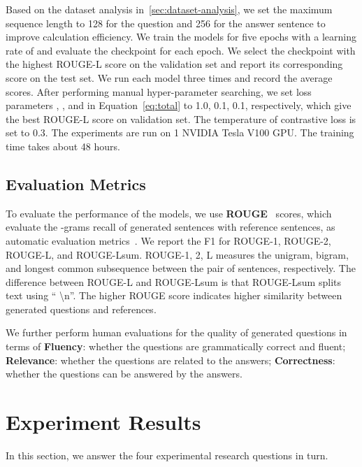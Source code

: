 \documentclass[11pt]{article}
\begin{document}
Based on the dataset analysis in~\ref{sec:dataset-analysis}, we set the maximum sequence length to 128 for the question and 256 for the answer sentence to improve calculation efficiency.
We train the models for five epochs with a learning rate of  and evaluate the checkpoint for each epoch. 
We select the checkpoint with the highest ROUGE-L score on the validation set and report its corresponding score on the test set.
We run each model three times and record the average scores. 
After performing manual hyper-parameter searching, we set loss parameters , , and  in Equation~\ref{eq:total} to 1.0, 0.1, 0.1, respectively, which give the best ROUGE-L score on validation set. The temperature of contrastive loss  is set to 0.3. The experiments are run on 1 NVIDIA Tesla V100 GPU. The training time takes about 48 hours.

\subsection{Evaluation Metrics}
To evaluate the performance of the models, we use \textbf{ROUGE}~\cite{lin-2004-rouge} scores, which evaluate the -grams recall of generated sentences with reference sentences, as automatic evaluation metrics~\cite{fan-etal-2019-eli5,khashabi-etal-2021-gooaq-open}. We report the F1 for ROUGE-1, ROUGE-2, ROUGE-L, and ROUGE-Lsum. ROUGE-1, 2, L measures the unigram, bigram, and longest common subsequence between the pair of sentences, respectively. The difference between ROUGE-L and ROUGE-Lsum is that ROUGE-Lsum splits text using `` \textbackslash n''. The higher ROUGE score indicates higher similarity between generated questions and references. 

We further perform human evaluations for the quality of generated questions in terms of \textbf{Fluency}: whether the questions are grammatically correct and fluent; \textbf{Relevance}: whether the questions are related to the answers; \textbf{Correctness}: whether the questions can be answered by the answers.

\section{Experiment Results}
In this section, we answer the four experimental research questions in turn.
\end{document}
